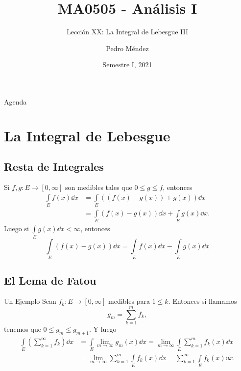 \documentclass[utf8]{beamer}
\title[MA0505]{MA0505 - An\'alisis I}
\subtitle{Lecci\'on XX: La Integral de Lebesgue III}
\author{Pedro M\'endez\inst{1}}
\institute[Universidad de Costa Rica] %
{
  \inst{1}%
  Departmento de Matem\'atica Pura y Ciencias Actuariales\\
  Universidad de Costa Rica
  }
\date[I-2021] {Semestre I, 2021}
\theoremstyle{plain}
\theoremstyle{definition}
\theoremstyle{remark}
\numberwithin{equation}{section}
\newcommand{\bonj}[1]{\left\lbrack#1\right\rbrack}
\renewcommand{\leq}{\leqslant}          %
\renewcommand{\.}{\Cdot}                %
\begin{document}
\begin{frame}
  \titlepage
\end{frame}

\begin{frame}{Agenda}
  \tableofcontents
\end{frame}





\section{La Integral de Lebesgue}

\subsection{Resta de Integrales}
\begin{frame}
Si $f,g:E\to\bonj{0,\infty}$ son medibles tales que $0\leq g\leq f$, entonces 
\begin{align*}
  \int\limits_Ef(x)\dd x&=\int\limits_E\left((f(x)-g(x))+g(x)\right)\dd x\\
  &=\int\limits_E\left(f(x)-g(x)\right)\dd x+\int\limits_Eg(x)\dd x.
\end{align*}
Luego si $\int\limits_Eg(x)\dd x<\infty$, entonces
$$\int\limits_E\left(f(x)-g(x)\right)\dd x=\int\limits_Ef(x)\dd x-\int\limits_Eg(x)\dd x$$
\end{frame}

\subsection{El Lema de Fatou}

\begin{frame}{Un Ejemplo}
  Sean $f_k:E\to\bonj{0,\infty}$ medibles para $1\leq k$. Entonces si llamamos
  $$g_m=\sum_{k=1}^mf_k,$$
  tenemos que $0\leq g_m\leq g_{m+1}$. Y luego 
  \begin{align*}
    \int\limits_E\left(\sum_{k=1}^\infty f_k\right)\dd x&=\int\limits_E \lim_{m\to\infty}g_m(x)\dd x=\lim_{m\to\infty}\int\limits_E \sum_{k=1}^mf_k(x)\dd x\\
    &=\lim_{m\to\infty} \sum_{k=1}^m\int\limits_Ef_k(x)\dd x=\sum_{k=1}^\infty\int\limits_Ef_k(x)\dd x.
  \end{align*}
\end{frame}
\end{document}
